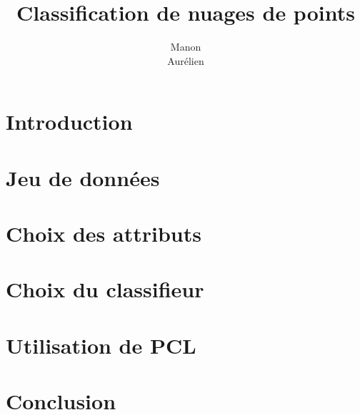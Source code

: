 \documentclass[12pt,titlepage,a4paper]{report}
\title{Classification de nuages de points}
\author{Manon \bsc{Ansart}\\ Aurélien \bsc{Massiot}}
\begin{document}

	\dominitoc
	\tableofcontents

	\chapter{Introduction}
		
        \chapter{Jeu de données}
		    
	\chapter{Choix des attributs}
		
        \chapter{Choix du classifieur}
		
        \chapter{Utilisation de PCL}
		
	\chapter{Conclusion}
		
\end{document}
